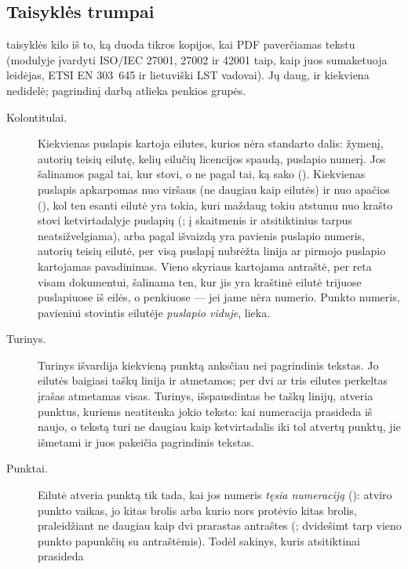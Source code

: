 \subsection{Taisyklės trumpai}\label{sec:corpus:rules}

 taisyklės kilo iš to, ką duoda tikros kopijos, kai PDF paverčiamas
tekstu (modulyje įvardyti ISO/IEC 27001, 27002 ir 42001 taip, kaip juos sumaketuoja leidėjas,
ETSI EN 303~645 ir lietuviški LST vadovai). Jų daug, ir kiekviena nedidelė; pagrindinį darbą
atlieka penkios grupės.

\begin{description}
  \item[Kolontitulai.] Kiekvienas puslapis kartoja eilutes, kurios nėra standarto dalis:
    žymenį, autorių teisių eilutę, kelių eilučių licencijos spaudą, puslapio numerį. Jos
    šalinamos pagal tai, kur stovi, o ne pagal tai, ką sako ().
    Kiekvienas puslapis apkarpomas nuo viršaus (ne daugiau kaip  eilutės) ir
    nuo apačios (), kol ten esanti eilutė yra tokia, kuri maždaug tokiu
    atstumu nuo krašto stovi ketvirtadalyje puslapių (; į skaitmenis ir
    atsitiktinius tarpus neatsižvelgiama), arba pagal išvaizdą yra pavienis puslapio numeris,
    autorių teisių eilutė, per visą puslapį nubrėžta linija ar pirmojo puslapio kartojamas
    pavadinimas. Vieno skyriaus kartojama antraštė, per reta visam dokumentui, šalinama
    ten, kur jis yra kraštinė eilutė trijuose puslapiuose iš eilės, o penkiuose --- jei jame
    nėra numerio. Punkto numeris, pavieniui stovintis eilutėje \emph{puslapio viduje},
    lieka.
  \item[Turinys.] Turinys išvardija kiekvieną punktą anksčiau nei pagrindinis tekstas. Jo
    eilutės baigiasi taškų linija ir atmetamos; per dvi ar tris eilutes perkeltas įrašas
    atmetamas visas. Turinys, išspausdintas be taškų linijų, atveria punktus, kuriems
    neatitenka jokio teksto: kai numeracija prasideda iš naujo, o tekstą turi ne daugiau kaip
    ketvirtadalis iki tol atvertų punktų, jie išmetami ir juos pakeičia pagrindinis tekstas.
  \item[Punktai.] Eilutė atveria punktą tik tada, kai jos numeris \emph{tęsia numeraciją}
    (): atviro punkto vaikas, jo kitas brolis arba kurio nors protėvio kitas
    brolis, praleidžiant ne daugiau kaip dvi prarastas antraštes (; dvidešimt
    tarp vieno punkto papunkčių su antraštėmis). Todėl sakinys, kuris atsitiktinai prasideda

\end{description}
